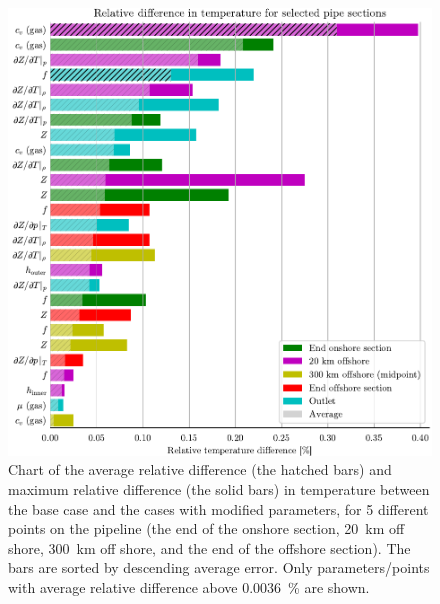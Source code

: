 
\begin{figure}[!p]%
    \centering%
    \includegraphics{figures/barchart_all_temperature_absolute.pdf}%
    \caption{%
        Chart of the average relative difference (the hatched bars) and maximum relative difference (the solid bars) in temperature between the base case and the cases with modified parameters, for 5 different points on the pipeline (the end of the onshore section, \SI{20}{\kilo\meter} off shore, \SI{300}{\kilo\meter} off shore, and the end of the offshore section). The bars are sorted by descending average error. 
        Only parameters/points with average relative difference above \SI{0.0036}{\percent} are shown.%
        \label{fig:temperatureBarChart}%
    }%
\end{figure}%

